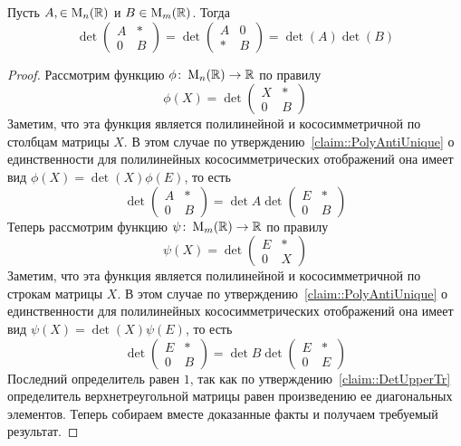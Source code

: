 \begin{claim}
\label{claim::DetZeroBlock}
Пусть $A,\in\operatorname{M}_{n}(\mathbb R)$ и $B\in\operatorname{M}_{m}(\mathbb R)$.
Тогда
\[
\det
\begin{pmatrix}
{A}&{*}\\
{0}&{B}
\end{pmatrix}
=
\det
\begin{pmatrix}
{A}&{0}\\
{*}&{B}
\end{pmatrix}
=
\det(A) \det(B)
\]
\end{claim}
\begin{proof}
Рассмотрим функцию $\phi\colon \operatorname{M}_{n}(\mathbb R)\to \mathbb R$ по правилу
\[
\phi(X) = 
\det
\begin{pmatrix}
{X}&{*}\\
{0}&{B}
\end{pmatrix}
\]
Заметим, что эта функция является полилинейной и кососимметричной по столбцам матрицы $X$.
В этом случае по утверждению~\ref{claim::PolyAntiUnique} о единственности для полилинейных кососимметрических отображений она имеет вид $\phi(X) = \det(X)\phi(E)$, то есть
\[
\det
\begin{pmatrix}
{A}&{*}\\
{0}&{B}
\end{pmatrix}
=
\det A
\det
\begin{pmatrix}
{E}&{*}\\
{0}&{B}
\end{pmatrix}
\]
Теперь рассмотрим функцию $\psi\colon \operatorname{M}_{m}(\mathbb R)\to \mathbb R$ по правилу
\[
\psi(X) =
\det
\begin{pmatrix}
{E}&{*}\\
{0}&{X}
\end{pmatrix}
\]
Заметим, что эта функция является полилинейной и кососимметричной по строкам матрицы $X$.
В этом случае по утверждению~\ref{claim::PolyAntiUnique} о единственности для полилинейных кососимметрических отображений она имеет вид $\psi(X) = \det(X)\psi(E)$, то есть
\[
\det
\begin{pmatrix}
{E}&{*}\\
{0}&{B}
\end{pmatrix}
=
\det B
\det
\begin{pmatrix}
{E}&{*}\\
{0}&{E}
\end{pmatrix}
\]
Последний определитель равен $1$, так как по утверждению~\ref{claim::DetUpperTr} определитель верхнетреугольной матрицы равен произведению ее диагональных элементов.
Теперь собираем вместе доказанные факты и получаем требуемый результат.
\end{proof}

